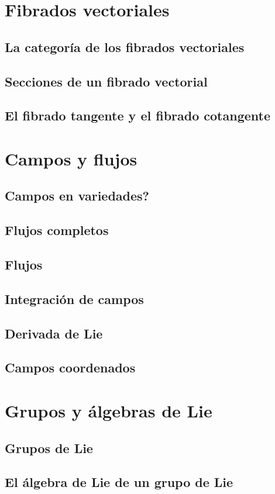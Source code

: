 \documentclass[12pt,a4paper]{book}
\theoremstyle{definition} \newtheorem{defn}[thm]{Definición}
\theoremstyle{definition} \newtheorem{ejemplo}[thm]{Ejemplo}
\theoremstyle{definition} \newtheorem{ejercicio}[thm]{Ejercicio}
\theoremstyle{remark} \newtheorem*{obs}{Observación}
\begin{document}
	  \chapter{Fibrados vectoriales}
	  \section{La categoría de los fibrados vectoriales}
	  \section{Secciones de un fibrado vectorial}
	  \section{El fibrado tangente y el fibrado cotangente}
	  \chapter{Campos y flujos}
	  \section{Campos en variedades?}
	  \section{Flujos completos}
	  \section{Flujos}
	  \section{Integración de campos}
	  \section{Derivada de Lie}
	  \section{Campos coordenados}
	  \chapter{Grupos y álgebras de Lie}
	  \section{Grupos de Lie}
	  \section{El álgebra de Lie de un grupo de Lie}
\end{document}
